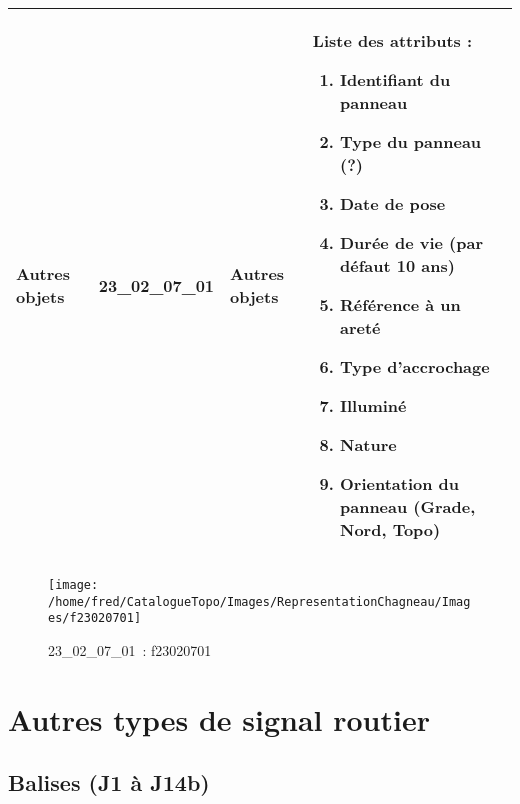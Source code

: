 \documentclass[12pt,titlepage]{book}
\begin{document}
\renewcommand{\arraystretch}{1.2}
\begin{supertabular}{|p{10cm}|c|p{13cm}|p{12cm}|}
 Autres objets & 23\_02\_07\_01 & Autres objets & Liste des attributs :
\begin{enumerate}
  \item Identifiant du panneau  \item Type du panneau (?)  \item Date de pose  \item Durée de vie (par défaut 10 ans)  \item Référence à un areté  \item Type d'accrochage  \item Illuminé  \item Nature  \item Orientation du panneau (Grade, Nord, Topo)\end{enumerate}
\\
\hline
\end{supertabular}
\begin{figure}[h!]
  \hfill         %
  \begin{minipage}[t]{3cm}
    \begin{center}
      \texttt{[image: /home/fred/CatalogueTopo/Images/RepresentationChagneau/Images/f23020701]}
      \caption[~23\_02\_07\_01]{\small{23\_02\_07\_01~:} \tiny{f23020701}}\label{f23020701}
    \end{center}
  \end{minipage}
\end{figure}

\section{\large Autres types de signal routier}
\subsection{Balises (J1 à J14b)}
\noindent
\vspace{\baselineskip}
\end{document}
